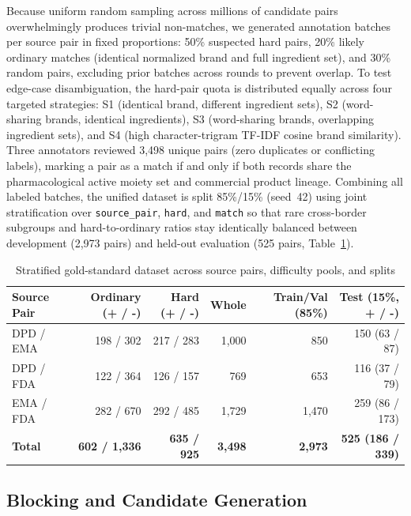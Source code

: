 \documentclass{llncs}
\begin{document}
Because uniform random sampling across millions of candidate pairs overwhelmingly produces trivial non-matches, we generated annotation batches per source pair in fixed proportions: 50\% suspected hard pairs, 20\% likely ordinary matches (identical normalized brand and full ingredient set), and 30\% random pairs, excluding prior batches across rounds to prevent overlap. To test edge-case disambiguation, the hard-pair quota is distributed equally across four targeted strategies: S1 (identical brand, different ingredient sets), S2 (word-sharing brands, identical ingredients), S3 (word-sharing brands, overlapping ingredient sets), and S4 (high character-trigram TF-IDF cosine brand similarity). Three annotators reviewed 3,498 unique pairs (zero duplicates or conflicting labels), marking a pair as a match if and only if both records share the pharmacological active moiety set and commercial product lineage. Combining all labeled batches, the unified dataset is split 85\%/15\% (seed~42) using joint stratification over \texttt{source\_pair}, \texttt{hard}, and \texttt{match} so that rare cross-border subgroups and hard-to-ordinary ratios stay identically balanced between development (2,973 pairs) and held-out evaluation (525 pairs, Table~\ref{tab:gs_split}).

\begin{table}[htbp]
\centering
\caption{Stratified gold-standard dataset across source pairs, difficulty pools, and splits}
\label{tab:gs_split}
\scriptsize
\setlength{\tabcolsep}{3pt}
\begin{tabularx}{\textwidth}{|>{\raggedright\arraybackslash}X|r|r|r|r|r|}
\hline
\textbf{Source Pair} & \textbf{Ordinary (+ / -)} & \textbf{Hard (+ / -)} & \textbf{Whole} & \textbf{Train/Val (85\%)} & \textbf{Test (15\%, + / -)} \\
\hline
DPD / EMA & 198 / 302 & 217 / 283 & 1,000 &   850 & 150 (63 / 87) \\
DPD / FDA & 122 / 364 & 126 / 157 &   769 &   653 & 116 (37 / 79) \\
EMA / FDA & 282 / 670 & 292 / 485 & 1,729 & 1,470 & 259 (86 / 173) \\
\hline
\textbf{Total} & \textbf{602 / 1,336} & \textbf{635 / 925} & \textbf{3,498} & \textbf{2,973} & \textbf{525 (186 / 339)} \\
\hline
\end{tabularx}
\end{table}

\subsection{Blocking and Candidate Generation}
\end{document}
